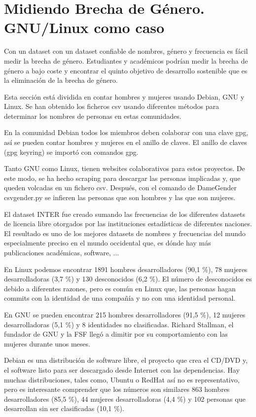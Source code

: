\documentclass[a4paper]{article}
\begin{document}
\section{Midiendo Brecha de Género. GNU/Linux como caso}
\label{sec:measuring}

Con un dataset con un dataset confiable de nombres, género y frecuencia es
fácil medir la brecha de género. Estudiantes y académicos podrían medir la
brecha de género a bajo coste y encontrar el quinto objetivo de desarrollo
sostenible que es la eliminación de la brecha de género.

Esta sección está dividida en contar hombres y mujeres usando Debian, GNU y
Linux. Se han obtenido los ficheros csv usando diferentes métodos para
determinar los nombres de personas en estas comunidades.

En la comunidad Debian todos los miembros deben colaborar con una clave gpg,
así se pueden contar hombres y mujeres en el anillo de claves. El anillo de
claves (gpg keyring) se importó con comandos gpg.

Tanto GNU como Linux, tienen websites colaborativos para estos proyectos.
De este modo, se ha hecho scraping para descargar las personas implicadas y,
que queden volcadas en un fichero csv. Después, con el comando de DameGender
csvgender.py se infieren las personas que son hombres y las que son mujeres.

El dataset INTER fue creado sumando las frecuencias de los diferentes datasets
de licencia libre otorgados por las instituciones estadísticas de diferentes
naciones. El resultado es uno de los mejores datasets de nombres y frecuencias
del mundo especialmente preciso en el mundo occidental que, es dónde hay más
publicaciones académicas, software, ...

En Linux podemos encontrar 1891 hombres desarrolladores (90,1 \%), 78 mujeres
desarrolladoras (3,7 \%) y 130 desconocidos (6,2 \%). El número de
desconocidos es debido a diferentes razones, pero es común en Linux que,
las personas hagan commits con la identidad de una compañía y no con una
identidad personal.

En GNU se pueden encontrar 215 hombres desarrolladores (91,5 \%), 12 mujeres
desarrolladoras (5,1 \%) y 8 identidades no clasificadas. Richard Stallman,
el fundador de GNU y la FSF llegó a dimitir por su comportamiento con las
mujeres durante unos meses.

Debian es una distribución de software libre, el proyecto que crea el
CD/DVD y, el software listo para ser descargado desde Internet con las
dependencias. Hay muchas distribuciones, tales como, Ubuntu o RedHat así
no es representativo, pero es interesante comprender que los números son
similares 863 hombres desarrolladores (85,5 \%), 44 mujeres desarrolladoras
(4,4 \%) y 102 personas que desarrollan sin ser clasificadas (10,1 \%).
\end{document}
